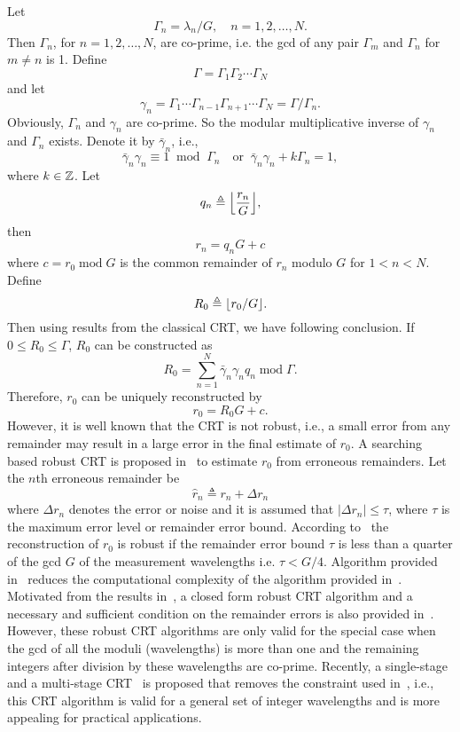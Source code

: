 Let
\[
\Gamma_n = \lambda_n/G, \quad n=1,2,\ldots,N.
\]
Then $\Gamma_n$, for $n=1,2,\ldots,N$, are co-prime, i.e. the gcd of any pair $\Gamma_m$ and $\Gamma_n$ for $m\neq n$ is 1. Define 
\[
\Gamma = \Gamma_1\Gamma_2 \cdots \Gamma_N
\]
and let
\[
\gamma_n = \Gamma_1 \cdots \Gamma_{n-1} \Gamma_{n+1} \cdots \Gamma_N = \Gamma/\Gamma_n.
\]
Obviously, $\Gamma_n$ and $\gamma_n$ are co-prime. So the modular multiplicative inverse of $\gamma_n$ and $\Gamma_n$ exists. Denote it by $\bar{\gamma}_n$, i.e., 
\[
\bar{\gamma}_n \gamma_n \equiv 1 \;\; \text{mod} \;\; \Gamma_n  \quad \text{or} \;\; \bar{\gamma}_n \gamma_n + k\Gamma_n =1, 
\]
where $k \in {\mathbb Z}$. Let 
\[
q_n \triangleq {\left\lfloor \frac{r_n}{G} \right\rfloor},
\] 
then
\[
r_n = q_n G + c
\]
where $c = r_0\; \text{mod}\; G$ is the common remainder of $r_n$ modulo $G$ for $1<n<N$. Define
\[
R_0  \triangleq {\left\lfloor r_0/G \right\rfloor}.
\]
Then using results from the classical CRT, we have following conclusion. If $0 \leq R_0 \leq \Gamma$, $R_0$ can be constructed as
\[
R_0 = \sum_{n=1}^N \bar{\gamma}_n \gamma_n q_n \; \text{mod} \; \Gamma.
\]
Therefore, $r_0$ can be uniquely reconstructed by
\[
r_0 = R_0G + c.
\]
However, it is well known that the CRT is not robust, i.e., a small error from any remainder may result in a large error in the final estimate of $r_0$. A searching based robust CRT is proposed in~\cite{XiaoweiLi2010, Xia2007} to estimate $r_0$ from erroneous remainders. Let the $n$th erroneous remainder be
\[
\hat{r}_n \triangleq r_n + \Delta r_n 
\]
where $\Delta r_n$ denotes the error or noise and it is assumed that $|\Delta r_n | \leq \tau$, where $\tau$ is the maximum error level or remainder error bound. According to~\cite{Xia2007} the reconstruction of $r_0$ is robust if the remainder error bound $\tau$ is less than a quarter of the gcd $G$ of the measurement wavelengths i.e. $\tau < G/4$. Algorithm provided in~\cite{Xiaowei_Li_robust_CRT_2009} reduces the computational complexity of the algorithm provided in~\cite{Xia2007}. Motivated from the results in~\cite{Xia2007, Xiaowei_Li_robust_CRT_2009}, a closed form robust CRT algorithm and a necessary and sufficient condition on the remainder errors is also provided in~\cite{W.Wang_closed_form_crt_2010}. However, these robust CRT algorithms are only valid for the special case when the gcd of all the moduli (wavelengths) is more than one and the remaining integers after division by these wavelengths are co-prime. Recently, a single-stage and a multi-stage CRT~\cite{Xiao_multistage_crt_2014} is proposed that removes the constraint used in~\cite{Xia2007, Xiaowei_Li_robust_CRT_2009, W.Wang_closed_form_crt_2010}, i.e., this CRT algorithm is valid for a general set of integer wavelengths and is more appealing for practical applications. 




